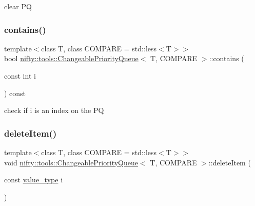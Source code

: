 clear PQ 

\mbox{\label{classnifty_1_1tools_1_1ChangeablePriorityQueue_ac6aa1d06e1cb5c2b13bfa58594e01ec6}} 
\subsubsection{\texorpdfstring{contains()}{contains()}}
{\footnotesize\ttfamily template$<$class T, class C\+O\+M\+P\+A\+RE = std\+::less$<$\+T$>$$>$ \\
bool \hyperlink{classnifty_1_1tools_1_1ChangeablePriorityQueue}{nifty\+::tools\+::\+Changeable\+Priority\+Queue}$<$ T, C\+O\+M\+P\+A\+RE $>$\+::contains (\begin{DoxyParamCaption}\item[{const int}]{i }\end{DoxyParamCaption}) const\hspace{0.3cm}{\ttfamily [inline]}}



check if i is an index on the PQ 

\mbox{\label{classnifty_1_1tools_1_1ChangeablePriorityQueue_af5b15b7c4cfedc7f95d168553a06a189}} 
\subsubsection{\texorpdfstring{delete\+Item()}{deleteItem()}}
{\footnotesize\ttfamily template$<$class T, class C\+O\+M\+P\+A\+RE = std\+::less$<$\+T$>$$>$ \\
void \hyperlink{classnifty_1_1tools_1_1ChangeablePriorityQueue}{nifty\+::tools\+::\+Changeable\+Priority\+Queue}$<$ T, C\+O\+M\+P\+A\+RE $>$\+::delete\+Item (\begin{DoxyParamCaption}\item[{const \hyperlink{classnifty_1_1tools_1_1ChangeablePriorityQueue_aa00fbc748b94bdc6175b4c49bb2bba48}{value\+\_\+type}}]{i }\end{DoxyParamCaption})\hspace{0.3cm}{\ttfamily [inline]}}



